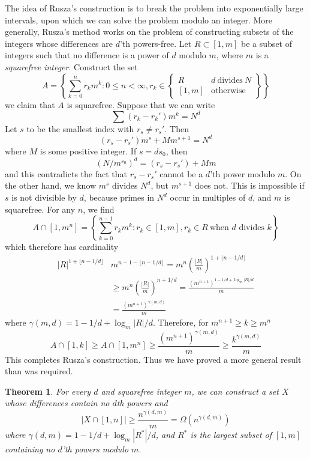 \documentclass{report}
\theoremstyle{plain}
\theoremstyle{plain}
\newtheorem{theorem}{Theorem}
\begin{document}
The idea of Rusza's construction is to break the problem into exponentially large intervals, upon which we can solve the problem modulo an integer. More generally, Rusza's method works on the problem of constructing subsets of the integers whose differences are $d$'th powers-free. Let $R \subset [1,m]$ be a subset of integers such that no difference is a power of $d$ modulo $m$, where $m$ is a {\it squarefree integer}. Construct the set
%
\[ A = \left\{ \sum_{k = 0}^n r_k m^k : 0 \leq n < \infty, r_k \in \left. \begin{cases} R & d\ \text{divides}\ N\\ [1,m] & \text{otherwise} \end{cases} \right\} \right\} \]
%
we claim that $A$ is squarefree. Suppose that we can write
%
\[ \sum (r_k - r_k') m^k = N^d \]
%
Let $s$ to be the smallest index with $r_s \neq r_s'$. Then
%
\[ (r_s - r_s') m^s + M m^{s+1} = N^d \]
%
where $M$ is some positive integer. If $s = ds_0$, then
%
\[ (N/m^{s_0})^d = (r_s - r_s') + M m \]
%
and this contradicts the fact that $r_s - r_s'$ cannot be a $d$'th power modulo $m$. On the other hand, we know $m^s$ divides $N^d$, but $m^{s+1}$ does not. This is impossible if $s$ is not divisible by $d$, because primes in $N^d$ occur in multiples of $d$, and $m$ is squarefree. For any $n$, we find
%
\[ A \cap [1,m^n] = \left\{ \sum_{k = 0}^{n-1} r_km^k : r_k \in [1,m], r_k \in R\ \text{when $d$ divides $k$} \right\} \]
%
which therefore has cardinality
%
\begin{align*}
    |R|^{1 + \lfloor n-1/d \rfloor}& m^{n-1- \lfloor n-1/d \rfloor} = m^n \left( \frac{|R|}{m} \right)^{1 + \lfloor n-1/d \rfloor}\\
    &\geq m^n \left( \frac{|R|}{m} \right)^{n+1/d} = \frac{(m^{n+1})^{1 - 1/d + \log_m |R|/d}}{m}\\
    &= \frac{(m^{n+1})^{\gamma(m,d)}}{m}
\end{align*}
%
where $\gamma(m,d) = 1 - 1/d + \log_m |R|/d$. Therefore, for $m^{n+1} \geq k \geq m^n$
%
\[ A \cap [1,k] \geq A \cap [1,m^n] \geq \frac{(m^{n+1})^{\gamma(m,d)}}{m} \geq \frac{k^{\gamma(m,d)}}{m} \]
%
This completes Rusza's construction. Thus we have proved a more general result than was required.

\begin{theorem}
    For every $d$ and squarefree integer $m$, we can construct a set $X$ whose differences contain no $d$th powers and
    \[ |X \cap [1,n]| \geq \frac{n^{\gamma(d,m)}}{m} = \Omega(n^{\gamma(d,m)}) \]
    where $\gamma(d,m) = 1 - 1/d + \log_m |R^*|/d$, and $R^*$ is the largest subset of $[1,m]$ containing no $d$'th powers modulo $m$.
\end{theorem}
\end{document}
